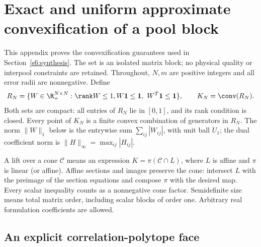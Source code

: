 \section{Exact and uniform approximate convexification of a pool block}
\label{app:convexification}

This appendix proves the convexification guarantees used in
Section~\ref{s6:synthesis}. The set is an isolated matrix block; no
physical quality or interpool constraints are retained. Throughout,
$N,m$ are positive integers and all error radii are nonnegative. Define
\[
 R_N=\{W\in\R_+^{N\times N}:\rank W\le1,
 W\mathbf1\le\mathbf1,\ W^T\mathbf1\le\mathbf1\},\qquad
 K_N=\conv(R_N).
\]
Both sets are compact: all entries of $R_N$ lie in $[0,1]$, and its
rank condition is closed. Every point of $K_N$ is a finite convex
combination of generators in $R_N$. The norm $\|W\|_1$ below is the
entrywise sum $\sum_{ij}|W_{ij}|$, with unit ball $U_1$; the dual
coefficient norm is $\|H\|_\infty=\max_{ij}|H_{ij}|$.

A lift over a cone $\mathcal C$ means an expression
$K=\pi(\mathcal C\cap L)$, where $L$ is affine and $\pi$ is linear
(or affine). Affine sections and images preserve the cone: intersect
$L$ with the preimage of the section equations and compose $\pi$ with
the desired map. Every scalar inequality counts as a nonnegative cone
factor. Semidefinite size means total matrix order, including scalar
blocks of order one. Arbitrary real formulation coefficients are allowed.

\subsection{An explicit correlation-polytope face}

